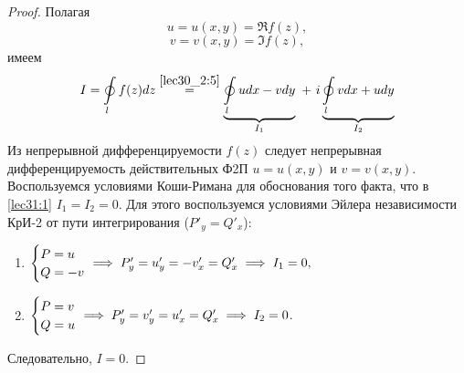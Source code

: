 \documentclass[../../main.tex]{subfiles}
\begin{document}
\begin{proof}
	Полагая
	\[ u = u(x, y) = \Re f(z), \]
	\[ v = v(x, y) = \Im f(z), \]
	имеем
	\begin{equation}
		\label{lec31:1}
		 I = \oint\limits_{l} f(z) dz \stk{lec30_2:5}=
		\underbrace{ \oint\limits_{l} u dx - v dy }_{I_1}
		\ + \ i \underbrace{ \oint\limits_{l} v dx + u dy }_{I_2}
	\end{equation}
	Из непрерывной дифференцируемости $f(z)$ следует непрерывная
	дифференцируемость действительных Ф2П $u = u(x, y)$ и $ v = v(x, y)$.
	Воспользуемся условиями Коши-Римана для обоснования того факта, что в
	\eqref{lec31:1} $I_1 = I_2 = 0$. Для этого воспользуемся условиями
	Эйлера независимости КрИ-2 от пути интегрирования
	($P'_y = Q'_x$):
	\begin{enumerate}
		\item $\begin{cases}
				P = u \\
				Q = -v
			\end{cases} \hspace{-1em} \implies P'_y = u'_y = -v'_x = Q'_x
			\implies I_1 = 0,$
		\item $\begin{cases}
			P = v \\
			Q = u
		\end{cases} \hspace{-1em} \implies P'_y = v'_y = u'_x = Q'_x
		\implies I_2 = 0$.
	\end{enumerate}
	Следовательно, $I = 0$.
\end{proof}
\end{document}
